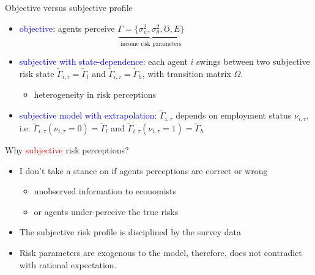 \documentclass{beamer}
\begin{document}
\begin{frame}{Objective  versus subjective profile}
	\begin{itemize}
		\item \textcolor{blue}{objective}: agents perceive $\underbrace{\Gamma =\{\sigma^2_\psi,\sigma^2_\theta,\mho,E\}}_{\text{income risk parameters}}$ 
			\item \textcolor{blue}{subjective with state-dependence}: each agent $i$ swings between two  subjective risk state  $\tilde \Gamma_{i,\tau} = \tilde \Gamma_l$ and $\tilde \Gamma_{i,\tau} = \tilde \Gamma_h$, with transition matrix $\Omega$. 
			\begin{itemize}
				\item heterogeneity in risk perceptions 
			\end{itemize}
			\item \textcolor{blue}{subjective model with extrapolation}:  $\tilde \Gamma_{i,\tau}$ depends on employment status $\nu_{i,\tau}$, i.e. $\tilde \Gamma_{i,\tau}(\nu_{i,\tau}=0) = \tilde \Gamma_l$ and $\tilde \Gamma_{i,\tau}(\nu_{i,\tau}=1) = \tilde \Gamma_h$
	\end{itemize}
\end{frame}


\begin{frame}{Why \textcolor{red}{subjective} risk perceptions?}
	\begin{itemize}
		\item I don't take a stance on if agents perceptions are correct or wrong
		\begin{itemize}
			\item  unobserved information to economists
			\item or agents under-perceive the true risks 
		\end{itemize}
		\item The subjective risk profile is disciplined by the survey data 
		\item Risk parameters are exogenous to the model, therefore, does not contradict with rational expectation. 
	\end{itemize}
\end{frame}
\end{document}
